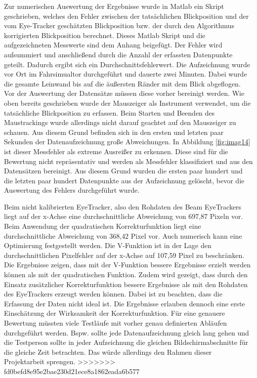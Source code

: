 Zur numerischen Auswertung der Ergebnisse wurde in Matlab ein Skript geschrieben, welches den Fehler zwischen der tatsächlichen Blickposition und der vom Eye-Tracker geschätzten Blickposition bzw. der durch den Algorithmus korrigierten Blickposition berechnet. Dieses Matlab Skript und die aufgezeichneten Messwerte sind dem Anhang beigefügt. Der Fehler wird aufsummiert und anschließend durch die Anzahl der erfassten Datenpunkte geteilt. Dadurch ergibt sich ein Durchschnittsfehlerwert. Die Aufzeichnung wurde vor Ort im Fahrsimualtor durchgeführt und dauerte zwei Minuten. Dabei wurde die gesamte Leinwand bis auf die äußersten Ränder mit dem Blick abgeflogen. Vor der Auswertung der Datensätze müssen diese vorher bereinigt werden. Wie oben bereits geschrieben wurde der Mauszeiger als Instrument verwendet, um die tatsächliche Blickposition zu erfassen. Beim Starten und Beenden des Maustrackings wurde allerdings nicht darauf geachtet auf den Mauszeiger zu schauen. Aus diesem Grund befinden sich in den ersten und letzten paar Sekunden der Datenaufzeichnung große Abweichungen. In Abbildung \ref{fig:imag14} ist dieser Messfehler als extreme Ausreißer zu erkennen. Diese sind für die Bewertung nicht repräsentativ und werden als Messfehler klassifiziert und aus den Datensätzen bereinigt. Aus diesem Grund wurden die ersten paar hundert und die letzten paar hundert Datenpunkte aus der Aufzeichnung gelöscht, bevor die Auswertung des Fehlers durchgeführt wurde. 

Beim nicht kalibrierten EyeTracker, also den Rohdaten des Beam EyeTrackers liegt auf der x-Achse eine durchschnittliche Abweichung von 697,87 Pixeln vor. 
Beim Anwendung der quadratischen Korrekturfunktion liegt eine durchschnittliche Abweichung von 368,42 Pixel vor. Auch numerisch kann eine Optimierung festgestellt werden. 
Die V-Funktion ist in der Lage den durchschnittlichen Pixelfehler auf der x-Achse auf 107,59 Pixel zu beschränken. 
Die Ergebnisse zeigen, dass mit der V-Funktion bessere Ergebnisse erzielt werden können als mit der quadratischen Funktion. Zudem wird gezeigt, dass durch den Einsatz zusätzlicher Korrekturfunktion bessere Ergebnisse als mit den Rohdaten des EyeTrackers erzeugt werden können. Dabei ist zu beachten, dass die Erfassung der Daten nicht ideal ist. Die Ergebnisse erlauben dennoch eine erste Einschätzung der Wirksamkeit der Korrekturfunktion. Für eine genauere Bewertung müssten viele Testläufe mit vorher genau definierten Abläufen durchgeführt werden. Bspw. sollte jede Datenaufzeichnung gleich lang gehen und die Testperson sollte in jeder Aufzeichnung die gleichen Bildschirmabschnitte für die gleiche Zeit betrachten. Das würde allerdings den Rahmen dieser Projektarbeit sprengen. 
>>>>>>> fd0befd8e95e2bae230d21ece8a1862eada6b577

